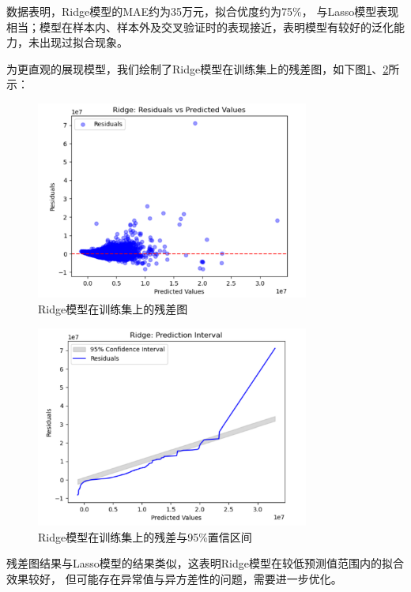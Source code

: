 \documentclass[
    report,     %
    oneside,    %
    UTF8,       %
    zihao=-4    %
]{config} %
\begin{document}
数据表明，Ridge模型的MAE约为35万元，拟合优度约为75\%，
与Lasso模型表现相当；模型在样本内、样本外及交叉验证时的表现接近，表明模型有较好的泛化能力，未出现过拟合现象。

为更直观的展现模型，我们绘制了Ridge模型在训练集上的残差图，如下图\ref{fig:Ridge_residual}、\ref{fig:Ridge_residual_interval}所示：

\begin{figure}[H]
    \centering
    \includegraphics[width=0.8\textwidth]{figures/Ridge-残差图.png}
    \caption{Ridge模型在训练集上的残差图}
    \label{fig:Ridge_residual}
\end{figure}

\begin{figure}[H]
    \centering
    \includegraphics[width=0.8\textwidth]{figures/Ridge-置信区间.png}
    \caption{Ridge模型在训练集上的残差与95\%置信区间}
    \label{fig:Ridge_residual_interval}
\end{figure}

残差图结果与Lasso模型的结果类似，这表明Ridge模型在较低预测值范围内的拟合效果较好，
但可能存在异常值与异方差性的问题，需要进一步优化。
\end{document}
